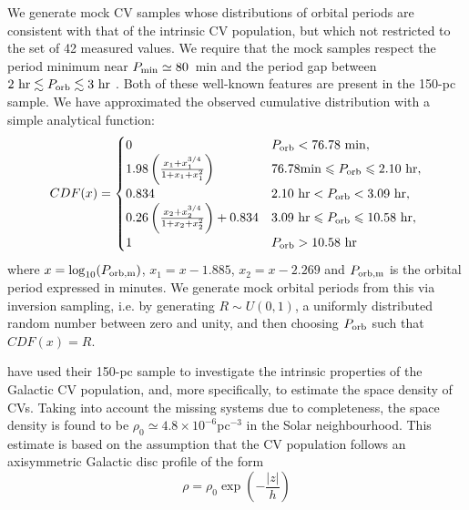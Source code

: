 \documentclass[fleqn,usenatbib]{mnras}
\begin{document}
We generate mock CV samples whose distributions of orbital periods are consistent with that of the intrinsic CV population, but which not restricted to the set of 42 measured values. We require that the mock samples respect the period minimum near $P_{\rm{min}} \simeq 80$~min and the period gap between $2~\mathrm{hr} \lesssim P_{\rm{orb}} \lesssim 3~\mathrm{hr}$ \citep[e.g.][]{gansicke09, knigge06}. Both of these well-known features are present in the \cite{pala20} 150-pc sample. We have approximated the observed cumulative distribution with a simple analytical function:
\begin{equation}
CDF(x) = 
\begin{cases}
      0 & P_{\rm{orb}} < 76.78~\mathrm{min}, \\
      1.98 \left(\frac{x_1 + x_1^{3/4}}{1 + x_1 + x_1^2}\right) & 76.78 \mathrm{min} \leq P_{\rm{orb}} \leq 2.10~\mathrm{hr},\\
      0.834 & 2.10~\mathrm{hr} < P_{\rm{orb}} < 3.09~\mathrm{hr},\\
      0.26 \left(\frac{x_2 + x_2^{3/4}}{1 + x_2 + x_2^2}\right) + 0.834  & 3.09~\mathrm{hr} \leq P_{\rm{orb}} \leq 10.58~\mathrm{hr},\\
      1 & P_{\rm{orb}} > 10.58~\mathrm{hr}
\end{cases}
\label{eq:cdf}
\end{equation}
where $x = \log_{10}({P_{\rm{orb,m}}})$, $x_1 = x - 1.885$, $x_2 = x - 2.269$
and $P_{\rm{orb,m}}$ is the orbital period expressed in minutes. %
We generate mock orbital periods from this via inversion sampling, i.e. by generating $R \sim U(0,1)$, a uniformly distributed random number between zero and unity, and then choosing $P_{\rm{orb}}$ such that $CDF(x) = R$. 

\cite{pala20} have used their 150-pc sample to investigate the intrinsic properties of the Galactic CV population, and, more specifically, to estimate the space density of CVs. Taking into account the missing systems due to completeness, the space density is found to be $\rho_0\simeq4.8 \times 10^{-6}$pc$^{-3}$ in the Solar neighbourhood. This estimate is based on the assumption that the CV population follows an axisymmetric Galactic disc profile of the form
\begin{equation}
\label{eq:disk}
    \rho = \rho_{0} \exp \left(-\frac{|z|}{h}\right)
\end{equation}
\end{document}
